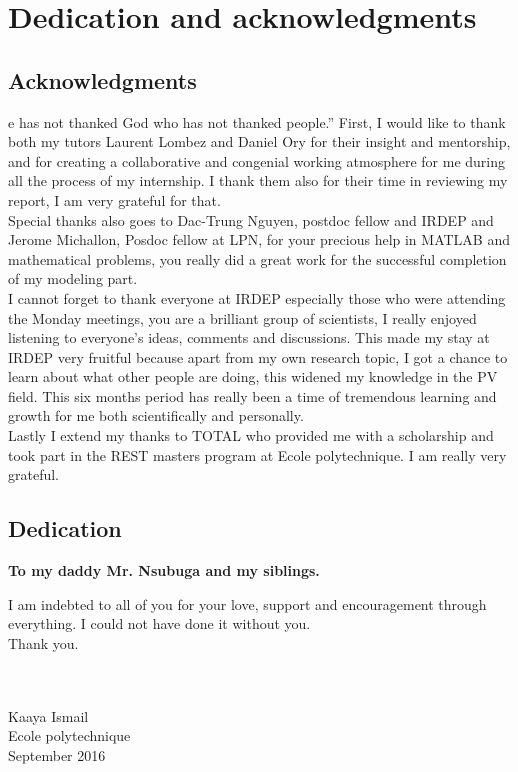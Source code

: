 %
%

\chapter*{Dedication and acknowledgments}
\begin{SingleSpace}
\section*{Acknowledgments}
e has not thanked God who has not thanked people.'' First, I would like to thank both my tutors Laurent Lombez and Daniel Ory for their insight and mentorship, and for creating a collaborative and congenial working atmosphere for me during all the process of my internship. I thank them also for their time in reviewing my report, I am very grateful for that. 
\\Special thanks also goes to Dac-Trung Nguyen, postdoc fellow and IRDEP and Jerome Michallon, Posdoc fellow at LPN, for your precious help in MATLAB and mathematical problems, you really did a great work for the successful completion of my modeling part.  
\\ I cannot forget to thank everyone at IRDEP especially those who were attending the Monday meetings, you are a brilliant group of scientists, I really enjoyed listening to everyone's ideas, comments and discussions. This made my stay at IRDEP very fruitful because apart from my own research topic, I got a chance to learn about what other people are doing, this widened my knowledge in the PV field. This six months period  has really been a time of tremendous learning and growth for me both scientifically and personally. 
\\ Lastly I extend my thanks to TOTAL who provided me with a scholarship and took part in the REST masters program at Ecole polytechnique. I am really very grateful.
\section*{Dedication}
\begin{center}
\textbf{To my daddy Mr. Nsubuga and my siblings.}
\end{center}
I am indebted to all of you for your love, support and encouragement through everything. I could not have done it without you. 
\\Thank you.\\
\\
\\
\begin{minipage}{6\textwidth}
\begin{flushleft} \large
Kaaya Ismail\\%
Ecole polytechnique\\
September 2016
\end{flushleft}
\end{minipage}
\end{SingleSpace}
\clearpage